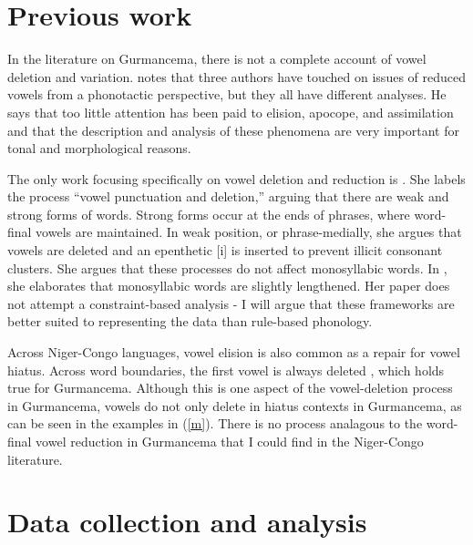 \documentclass[output=paper,newtxmath,modfonts,nonflat,draftmode]{langsci/langscibook}
\begin{document}
\section{Previous work} \label{sec:baird:3}

In the literature on Gurmancema, there is not a complete account of vowel deletion and variation. \citet{Naba1994} notes that three authors have touched on issues of reduced vowels from a phonotactic perspective, but they all have different analyses. He says that too little attention has been paid to elision, apocope, and assimilation and that the description and analysis of these phenomena are very important for tonal and morphological reasons.

The only work focusing specifically on vowel deletion and reduction is \citet{Rialland1980,Rialland2001}. She labels the process “vowel punctuation and deletion,'' arguing that there are weak and strong forms of words.  Strong forms occur at the ends of phrases, where word-final vowels are maintained. In weak position, or phrase-medially, she argues that vowels are deleted and an epenthetic [i] is inserted to prevent illicit consonant clusters. She argues that these processes do not affect monosyllabic words. In \citet{Rialland2001}, she elaborates that monosyllabic words are slightly lengthened. Her paper does not attempt a constraint-based analysis - I will argue that these frameworks are better suited to representing the data than rule-based phonology. 
	
Across Niger-Congo languages, vowel elision is also common as a repair for vowel hiatus. Across word boundaries, the first vowel is always deleted \citep{Casali1997}, which holds true for Gurmancema. Although this is one aspect of the vowel-deletion process in Gurmancema, vowels do not only delete in hiatus contexts in Gurmancema, as can be seen in the examples in (\ref{m}). There is no process analagous to the word-final vowel reduction in Gurmancema that I could find in the Niger-Congo literature. 
 
\section{Data collection and analysis}\label{sec:baird:4}
\end{document}
